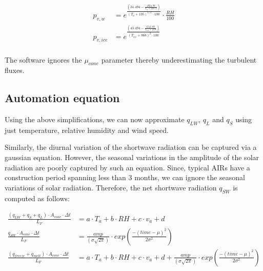 \documentclass[utf8]{frontiersSCNS}
\begin{document}
\begin{equation}
	\begin{split}
		p_{v,w}&=e^{\frac{(34.494 - \frac{4924.99}{T_{a} + 237.1})}{(T_a + 105)^{1.57} \cdot 100}} \cdot \frac{RH}{100} \\
		p_{v,ice}&=e^{\frac{(43.494 - \frac{6545.89}{T_{ice} + 278})}{(T_{ice} + 868)^{2} \cdot 100}} \\
	\end{split} \label{eqn:vp}
\end{equation}

The software ignores the $\mu_{cone}$ parameter thereby underestimating the turbulent fluxes.

\subsection{Automation equation}

Using the above simplifications, we can now approximate $q_{LW}$, $q_{L}$ and $q_{S}$ using just temperature, relative
humidity and wind speed.

Similarly, the diurnal variation of the shortwave radiation can be captured via a gaussian equation. However,
the seasonal variations in the amplitude of the solar radiation are poorly captured by such an equation. Since,
typical AIRs have a construction period spanning less than 3 months, we can ignore the seasonal variations of
solar radiation. Therefore, the net shortwave radiation $q_{SW}$ is computed as follows: 


\begin{subequations}

	\begin{align}
		\label{eq:T}
    \frac{(q_{LW} + q_{S} + q_{L}) \cdot A_{cone} \cdot \Delta t}{L_F} & = a \cdot T_a + b \cdot RH + c \cdot v_a +
  d \\
		\label{eq:SW}
    \frac{q_{SW} \cdot A_{cone} \cdot \Delta t}{L_F} & = \frac{amp}{(\sigma \sqrt{2\pi})} \cdot
    exp\left(\frac{-(time-\mu)^2}{2\sigma^2}\right) \\
		\label{eq:auto}
    \frac{(q_{freeze} + q_{melt}) \cdot A_{cone} \cdot \Delta t}{L_F} & = a \cdot T_a + b \cdot RH + c \cdot v_a + d
  +\frac{amp}{(\sigma \sqrt{2\pi})} \cdot exp\left(\frac{-(time-\mu)^2}{2\sigma^2}\right)
	\end{align}
\end{subequations}
\end{document}
